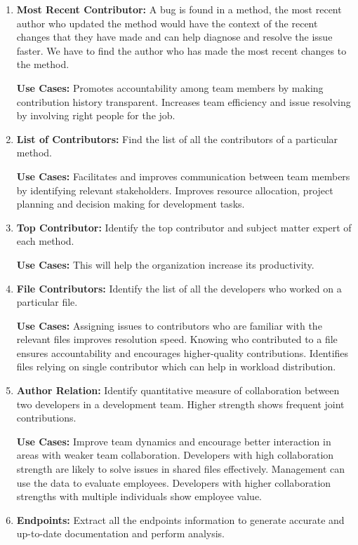 \begin{enumerate}[before={\vspace{10pt}}, after={\vspace{10pt}}, itemsep=10pt, nosep, leftmargin=\parindent, labelindent=0pt]
    \item \textbf{Most Recent Contributor:} A bug is found in a method, the most recent author who updated the method would have the context of the recent changes that they have made and can help diagnose and resolve the issue faster. We have to find the author who has made the most recent changes to the method.

    \textbf{Use Cases:} Promotes accountability among team members by making contribution history transparent. Increases team efficiency and issue resolving by involving right people for the job.
    \vspace{10pt}
    \item \textbf{List of Contributors:} Find the list of all the contributors of a particular method.
    
    \textbf{Use Cases:} Facilitates and improves communication between team members by identifying relevant stakeholders. Improves resource allocation, project planning and decision making for development tasks.
    \vspace{10pt}
    \item \textbf{Top Contributor:} Identify the top contributor and subject matter expert of each method.
    
    \textbf{Use Cases:} This will help the organization increase its productivity.
    \vspace{10pt}
    \item \textbf{File Contributors:} Identify the list of all the developers who worked on a particular file.
    
    \textbf{Use Cases:} Assigning issues to contributors who are familiar with the relevant files improves resolution speed. Knowing who contributed to a file ensures accountability and encourages higher-quality contributions. Identifies files relying on single contributor which can help in workload distribution.
    \vspace{10pt}
    \item \textbf{Author Relation:} Identify quantitative measure of collaboration between two developers in a development team. Higher strength shows frequent joint contributions.
    
    \textbf{Use Cases:} Improve team dynamics and encourage better interaction in areas with weaker team collaboration. Developers with high collaboration strength are likely to solve issues in shared files effectively. Management can use the data to evaluate employees. Developers with higher collaboration strengths with multiple individuals show employee value.
    \vspace{10pt}
    \item \textbf{Endpoints:} Extract all the endpoints information to generate accurate and up-to-date documentation and perform analysis.
    

\end{enumerate}
